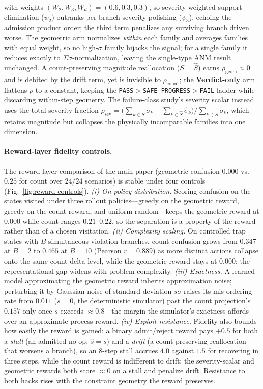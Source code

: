 \documentclass[letterpaper]{article} %
\begin{document}
with weights $(W_2,W_3,W_d)=(0.6,0.3,0.3)$, so severity-weighted support elimination ($\psi_2$) outranks per-branch severity polishing ($\psi_3$), echoing the admission product order; the third term penalizes any surviving branch driven worse. The geometric arm normalizes \emph{within} each family and averages families with equal weight, so no high-$\sigma$ family hijacks the signal; for a single family it reduces exactly to $\Sigma\sigma$-normalization, leaving the single-type ANM result unchanged. A count-preserving magnitude reallocation ($S{=}\hat S$) earns $\rho_{\mathrm{geom}}\!\approx\!0$ and is debited by the drift term, yet is invisible to $\rho_{\mathrm{count}}$; the \textbf{Verdict-only} arm flattens $\rho$ to a constant, keeping the \texttt{PASS}${>}$\texttt{SAFE\_PROGRESS}${>}$\texttt{FAIL} ladder while discarding within-step geometry. The failure-class study's severity scalar instead uses the total-severity fraction $\rho_{\mathrm{sev}}=\big(\sum_{k\in S}\sigma_k-\sum_{k\in\hat S}\hat\sigma_k\big)/\sum_{k\in S}\sigma_k$, which retains magnitude but collapses the physically incomparable families into one dimension.

\paragraph{Reward-layer fidelity controls.}
The reward-layer comparison of the main paper (geometric confusion $0.000$ vs.\ $0.25$ for count over $24/24$ scenarios) is stable under four controls (Fig.~\ref{fig:reward-controls}). \emph{(i) On-policy distribution.} Scoring confusion on the states visited under three rollout policies---greedy on the geometric reward, greedy on the count reward, and uniform random---keeps the geometric reward at $0.000$ while count ranges $0.21$--$0.22$, so the separation is a property of the reward rather than of a chosen visitation. \emph{(ii) Complexity scaling.} On controlled trap states with $B$ simultaneous violation branches, count confusion grows from $0.347$ at $B{=}2$ to $0.465$ at $B{=}10$ (Pearson $r{=}0.889$) as more distinct actions collapse onto the same count-delta level, while the geometric reward stays at $0.000$: the representational gap widens with problem complexity. \emph{(iii) Exactness.} A learned model approximating the geometric reward inherits approximation noise; perturbing it by Gaussian noise of standard deviation $s\sigma$ raises its mis-ordering rate from $0.011$ ($s{=}0$, the deterministic simulator) past the count projection's $0.157$ only once $s$ exceeds ${\approx}0.8$---the margin the simulator's exactness affords over an approximate process reward. \emph{(iv) Exploit resistance.} Fidelity also bounds how easily the reward is gamed: a binary admit/reject reward pays $+0.5$ for both a \emph{stall} (an admitted no-op, $\hat s{=}s$) and a \emph{drift} (a count-preserving reallocation that worsens a branch), so an $8$-step stall accrues $4.0$ against $1.5$ for recovering in three steps, while the count reward is indifferent to drift; the severity-scalar and geometric rewards both score ${\approx}0$ on a stall and penalize drift. Resistance to both hacks rises with the constraint geometry the reward preserves.
\end{document}
